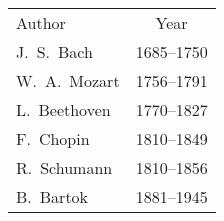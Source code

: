 
\begin{tabular}{lc}
	\rowcolor{colorfamA!35!white}
	Author & Year\\
	J.\ S.\ Bach
	& 1685--1750 \\
	W.\ A.\ Mozart & 1756--1791 \\
	L.\ Beethoven & 1770--1827 \\
	F.\ Chopin
	& 1810--1849 \\
	R.\ Schumann
	& 1810--1856 \\
	B.\ Bartok & 1881--1945 \\
\end{tabular}
